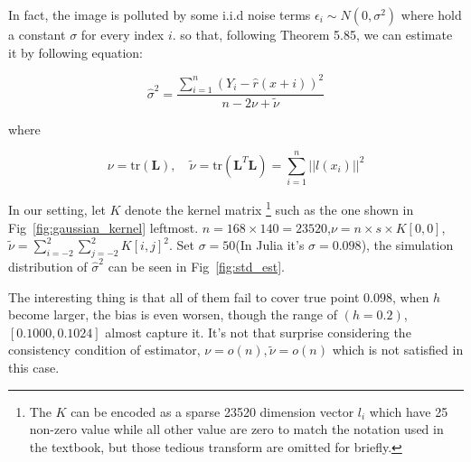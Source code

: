 \documentclass{article}
\begin{document}
In fact, the image is polluted by some i.i.d noise terms $\epsilon_i \sim N(0,\sigma^2)$ where hold a constant $\sigma$ for every index $i$.
so that, following \cite{wasserman2006all} Theorem 5.85, we can estimate it by following equation:

$$
\hat{\sigma}^2=\frac{\sum_{i=1}^n (Y_i-\hat{r}(x+i))^2}{n-2\nu+\tilde{\nu}}
$$

where

$$
\nu = \mathrm{tr}(\mathbf{L}), \quad 
\tilde{\nu}=\mathrm{tr}(\mathbf{L}^T\mathbf{L})=\sum_{i=1}^n||l(x_i)||^2
$$

In our setting, let $K$ denote the kernel matrix
\footnote{The $K$ can be encoded as a sparse 23520 dimension vector $l_i$ which have 25 non-zero value while all other value are zero to match
the notation used in the textbook, but those tedious transform are omitted for briefly.}
such as the one shown in Fig~\ref{fig:gaussian_kernel} leftmost.
$n = 168 \times 140 = 23520$,$\nu = n \times s \times K[0,0]$,
$\tilde{\nu} = \sum_{i=-2}^2\sum_{j=-2}^2 K[i,j]^2$. 
Set $\sigma=50$(In Julia it's $\sigma=0.098$), 
the simulation distribution of $\hat{\sigma}^2$ can be seen in Fig~\ref{fig:std_est}. 

The interesting thing is that all of them fail to cover true point $0.098$, when $h$ become larger,
the bias is even worsen, though the range of $(h=0.2)$, $[0.1000,0.1024]$ almost capture it.
It's not that surprise considering the consistency condition of estimator, 
$\nu=o(n),\tilde{\nu}=o(n)$ which is not satisfied in this case.
\end{document}

